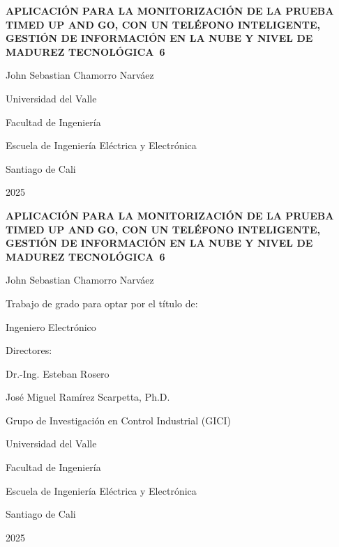 \documentclass[12pt]{report}
\begin{document}

\begin{titlepage}
    \centering
    \linespread{1.2}
    {\large \textbf{APLICACIÓN PARA LA MONITORIZACIÓN DE LA PRUEBA TIMED UP AND GO, CON UN TELÉFONO INTELIGENTE, GESTIÓN DE INFORMACIÓN EN LA NUBE Y NIVEL DE MADUREZ TECNOLÓGICA~6} \par}
    \vfill
    {\large John Sebastian Chamorro Narváez \par}
    \vfill
    {\large Universidad del Valle\par}
    {\large Facultad de Ingeniería \par}
    {\large Escuela de Ingeniería Eléctrica y Electrónica \par}
    {\large Santiago de Cali \par}
    {\large 2025 \par}
\end{titlepage}


\newpage
\thispagestyle{empty}
\begin{center}
    \linespread{1.2}
    {\large \textbf{APLICACIÓN PARA LA MONITORIZACIÓN DE LA PRUEBA TIMED UP AND GO, CON UN TELÉFONO INTELIGENTE, GESTIÓN DE INFORMACIÓN EN LA NUBE Y NIVEL DE MADUREZ TECNOLÓGICA~6} \par}
    \vfill
    {\large John Sebastian Chamorro Narváez \par}
    \vfill
    {\large Trabajo de grado para optar por el título de: \par}
    {\large Ingeniero Electrónico \par}
    \vfill
    {\large Directores: \par}
    {\large Dr.-Ing. Esteban Rosero \par}
    {\large José Miguel Ramírez Scarpetta, Ph.D. \par}
    \vfill
    {\large Grupo de Investigación en Control Industrial (GICI) \par}
    \vfill
    {\large Universidad del Valle \par}
    {\large Facultad de Ingeniería \par}
    {\large Escuela de Ingeniería Eléctrica y Electrónica \par}
    {\large Santiago de Cali \par}
    {\large 2025 \par}
\end{center}
\end{document}
